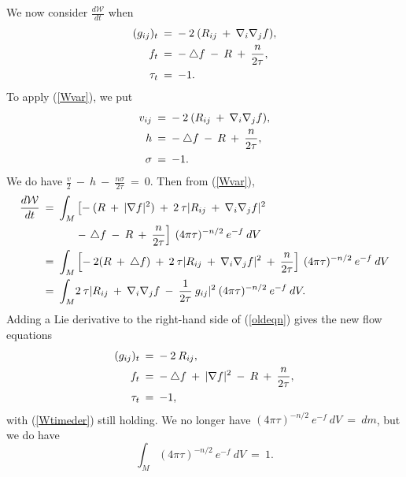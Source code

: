 \documentclass[12pt]{amsart}
\numberwithin{equation}{section}
\theoremstyle{plain}
\theoremstyle{definition}
\theoremstyle{remark}
\begin{document}
We now consider $\frac{d{\mathcal W}}{dt}$ when
\begin{align} \label{oldeqn}
(g_{ij})_t \: & = \: - \: 2 \: (R_{ij} \: + \: \nabla_i \nabla_j f ), \\ 
f_t \: & = \: - \: \triangle f \: - \: R \: + \: \frac{n}{2\tau}, \notag \\
\tau_t \: & = \: -1. \notag
\end{align}
To apply (\ref{Wvar}), we put
\begin{align}
v_{ij} \: & = \: - \: 2 \: (R_{ij} \: + \: \nabla_i \nabla_j f ), \\ 
h \: & = \: - \: \triangle f \: - \: R \: + \: \frac{n}{2\tau}, \notag \\
\sigma \: & = \: -1. \notag
\end{align}
We do have
$\frac{v}{2} \: - \: h \: - \: \frac{n\sigma}{2\tau} \: = \: 0$.
Then from (\ref{Wvar}),
\begin{align} \label{Wtimeder}
\frac{d{\mathcal W}}{dt} \: = \:
\int_M & \left[- \:  (R \: + \: |\nabla f|^2) 
\: + \: 2 \: \tau |R_{ij} \: + \: \nabla_i \nabla_j f|^2 \: 
\right. \\
& -\left. \triangle f \: - \: R \: + \: \frac{n}{2\tau}
 \right] \:
(4 \pi \tau)^{-n/2} \: e^{-f} \: dV \notag \\
= \:
\int_M & \left[- \:  2(R \: + \: \triangle f) 
\: + \: 2 \: \tau |R_{ij} \: + \: \nabla_i \nabla_j f|^2 
\: + \: \frac{n}{2\tau}
 \right] \:
(4 \pi \tau)^{-n/2} \: e^{-f} \: dV \notag \\
= \: \int_M &
2 \: \tau |R_{ij} \: + \: \nabla_i \nabla_j f
\: - \: \frac{1}{2\tau} \: g_{ij}|^2 \:
(4 \pi \tau)^{-n/2} \: e^{-f} \: dV. \notag
\end{align}
Adding a Lie derivative to the right-hand side of
(\ref{oldeqn}) gives the new flow equations
\begin{align} \label{neweqn}
(g_{ij})_t \: & = \: - \: 2 \: R_{ij}, \\ 
f_t \: & = \: - \: \triangle f \: + \: |\nabla f|^2
\: - \: R \: + \: \frac{n}{2\tau}, \notag \\
\tau_t \: & = \: -1, \notag
\end{align}
with (\ref{Wtimeder}) still holding. We no longer have
$(4 \pi \tau)^{-n/2} \: e^{-f} \: dV \: = \: dm$, but we do have
\begin{equation} \label{Wnorm}
\int_M (4 \pi \tau)^{-n/2} \: e^{-f} \: dV \: = \: 1.
\end{equation}
\end{document}
